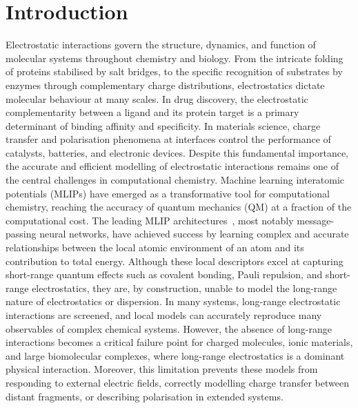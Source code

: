 \documentclass[aps,%
superscriptaddress,
 amsmath,amssymb,
floatfix,
twocolumn
]{revtex4-2}
\begin{document}
\section{Introduction}
Electrostatic interactions govern the structure, dynamics, and function of molecular systems throughout chemistry and biology. From the intricate folding of proteins stabilised by salt bridges, to the specific recognition of substrates by enzymes through complementary charge distributions, electrostatics dictate molecular behaviour at many scales. In drug discovery, the electrostatic complementarity between a ligand and its protein target is a primary determinant of binding affinity and specificity. In materials science, charge transfer and polarisation phenomena at interfaces control the performance of catalysts, batteries, and electronic devices. Despite this fundamental importance, the accurate and efficient modelling of electrostatic interactions remains one of the central challenges in computational chemistry.
%
Machine learning interatomic potentials (MLIPs) have emerged as a transformative tool for computational chemistry, reaching the accuracy of quantum mechanics (QM) at a fraction of the computational cost. The leading MLIP architectures~\cite{batatia_mace_2023, batzner20223NequIP, fu2025learningsmoothexpressiveinteratomic, rhodes2025orbv3atomisticsimulationscale, Mazitov2025}, most notably message-passing neural networks, have achieved success by learning complex and accurate relationships between the local atomic environment of an atom and its contribution to total energy. Although these local descriptors excel at capturing short-range quantum effects such as covalent bonding, Pauli repulsion, and short-range electrostatics, they are, by construction, unable to model the long-range nature of electrostatics or dispersion. In many systems, long-range electrostatic interactions are screened, and local models can accurately reproduce many observables of complex chemical systems. However, the absence of long-range interactions becomes a critical failure point for charged molecules, ionic materials, and large biomolecular complexes, where long-range electrostatics is a dominant physical interaction. Moreover, this limitation prevents these models from responding to external electric fields, correctly modelling charge transfer between distant fragments, or describing polarisation in extended systems. 
\end{document}
